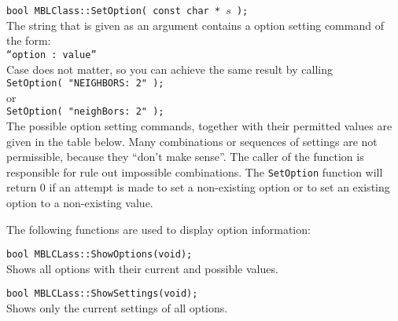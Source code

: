 \documentclass{report}
\begin{document}
\begin{description}
\item {\tt bool MBLClass::SetOption( const char * $s$ );}\\ 
The string that is given as an argument contains a option setting
command of the form:\\
{\tt ``option : value''}\\
Case does not matter, so you can achieve the same result by calling\\
\noindent
{\tt SetOption( "NEIGHBORS: 2" );}\\ 
or\\
\noindent
{\tt SetOption( "neighBors: 2" );}\\ 
The possible option setting commands, together with their permitted
values are given in the table below. Many combinations or sequences of
settings are not permissible, because they ``don't make sense''.  The
caller of the function is responsible for rule out impossible
combinations. The {\tt SetOption} function will return 0 if an attempt
is made to set a non-existing option or to set an existing option to a
non-existing value.

\item The following functions are used to display option information:

\item {\tt bool MBLCLass::ShowOptions(void);}\\
Shows all options with their current and possible values.

\item {\tt bool MBLCLass::ShowSettings(void);}\\
Shows only the current settings of all options.

\end{description}
\end{document}
